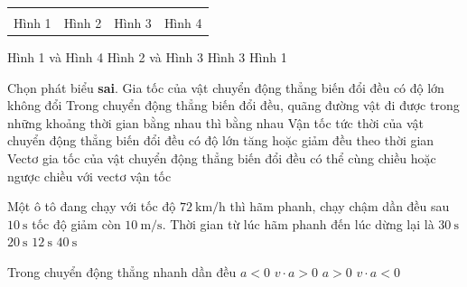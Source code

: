 \begin{ex}
\begin{center}
\begin{tabular}{M{4cm}M{4cm}M{4cm}M{4cm}}
&\\
			Hình 1&Hình 2&Hình 3&Hình 4
		\end{tabular}
	\end{center}	
	\choice
	{Hình 1 và Hình 4}
	{Hình 2 và Hình 3}
	{\True Hình 3}
	{Hình 1}
	\loigiai{}
\end{ex}
\begin{ex}
	Chọn phát biểu \textbf{sai}.
	\choice
	{Gia tốc của vật chuyển động thẳng biến đổi đều có độ lớn không đổi}
	{\True Trong chuyển động thẳng biến đổi đều, quãng đường vật đi được trong những khoảng thời gian bằng nhau thì bằng nhau}
	{Vận tốc tức thời của vật chuyển động thẳng biến đổi đều có độ lớn tăng hoặc giảm đều theo thời gian}
	{Vectơ gia tốc của vật chuyển động thẳng biến đổi đều có thể cùng chiều hoặc ngược chiều với vectơ vận tốc}
	\loigiai{}
\end{ex}
\begin{ex}
	Một ô tô đang chạy với tốc độ $\SI{72}{\kilo\meter/\hour}$ thì hãm phanh, chạy chậm dần đều sau $\SI{10}{\second}$ tốc độ giảm còn $\SI{10}{\meter/\second}$. Thời gian từ lúc hãm phanh đến lúc dừng lại là
	\choice
	{$\SI{30}{\second}$}
	{\True $\SI{20}{\second}$}
	{$\SI{12}{\second}$}
	{$\SI{40}{\second}$}
	\loigiai{}
\end{ex}
\begin{ex}
	Trong chuyển động thẳng nhanh dần đều	
	\choice
	{$a<0$}
	{\True $v\cdot a>0$}
	{$ a>0$}
	{$v\cdot a<0$}
	\loigiai{}
\end{ex}
